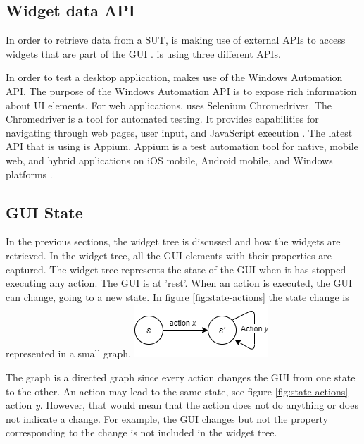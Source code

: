 \subsection{Widget data API}

In order to retrieve data from a SUT, \testar is making use of external APIs to access widgets that are part of the GUI \cite{thesisMulders}. \testar is using three different APIs.

In order to test a desktop application, \testar makes use of the Windows Automation API. The purpose of the Windows Automation API is to expose rich information about UI elements\cite{win-api-info}. For web applications, \testar uses Selenium Chromedriver. The Chromedriver is a tool for automated testing. It provides capabilities for navigating through web pages, user input, and JavaScript execution \cite{chrome-driver-info}. The latest API that \testar is using is Appium. Appium is a test automation tool for native, mobile web, and hybrid applications on iOS mobile, Android mobile, and Windows platforms \cite{appium-info}.

\subsection{GUI State} \label{gui-state}
In the previous sections, the widget tree is discussed and how the widgets are retrieved. In the widget tree, all the GUI elements with their properties are captured. The widget tree represents the state of the GUI when it has stopped executing any action. The GUI is at 'rest'. When an action is executed, the GUI can change, going to a new state. In figure \ref{fig:state-actions} the state change is represented in a small graph. 
\bigskip
\begingroup
\captionsetup{type=figure}
\includegraphics{images/state-action.png}
\label{fig:state-actions}
\endgroup

The graph is a directed graph since every action changes the GUI from one state to the other. An action may lead to the same state, see figure \ref{fig:state-actions} action \textit{y}. However, that would mean that the action does not do anything or \testar does not indicate a change. For example, the GUI changes but not the property corresponding to the change is not included in the widget tree.

